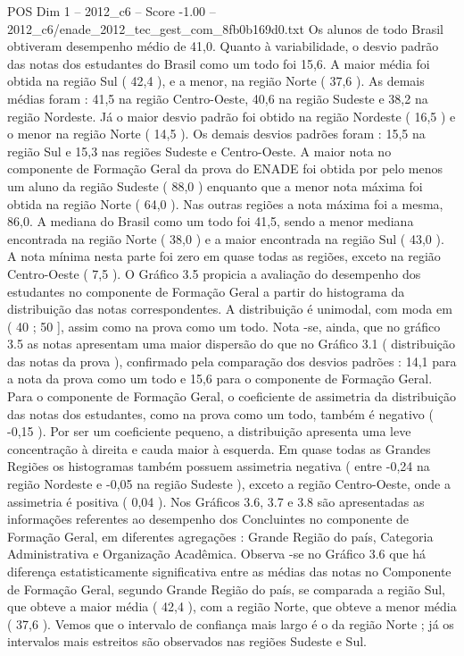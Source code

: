 \begin{textsample}{POS Dim 1 – 2012\_c6 – Score -1.00 – 2012\_c6/enade\_2012\_tec\_gest\_com\_8fb0b169d0.txt}
Os alunos de todo Brasil obtiveram desempenho médio de 41,0.
Quanto à variabilidade, o desvio padrão das notas dos estudantes do Brasil como um todo foi 15,6.
A maior média foi obtida na região Sul ( 42,4 ), e a menor, na região Norte ( 37,6 ).
As demais médias foram : 41,5 na região Centro-Oeste, 40,6 na região Sudeste e 38,2 na região Nordeste.
Já o maior desvio padrão foi obtido na região Nordeste ( 16,5 ) e o menor na região Norte ( 14,5 ).
Os demais desvios padrões foram : 15,5 na região Sul e 15,3 nas regiões Sudeste e Centro-Oeste.
A maior nota no componente de Formação Geral da prova do ENADE foi obtida por pelo menos um aluno da região Sudeste ( 88,0 ) enquanto que a menor nota máxima foi obtida na região Norte ( 64,0 ).
Nas outras regiões a nota máxima foi a mesma, 86,0.
A mediana do Brasil como um todo foi 41,5, sendo a menor mediana encontrada na região Norte ( 38,0 ) e a maior encontrada na região Sul ( 43,0 ).
A nota mínima nesta parte foi zero em quase todas as regiões, exceto na região Centro-Oeste ( 7,5 ).
O Gráfico 3.5 propicia a avaliação do desempenho dos estudantes no componente de Formação Geral a partir do histograma da distribuição das notas correspondentes.
A distribuição é unimodal, com moda em ( 40 ; 50 ], assim como na prova como um todo.
Nota -se, ainda, que no gráfico 3.5 as notas apresentam uma maior dispersão do que no Gráfico 3.1 ( distribuição das notas da prova ), confirmado pela comparação dos desvios padrões : 14,1 para a nota da prova como um todo e 15,6 para o componente de Formação Geral.
Para o componente de Formação Geral, o coeficiente de assimetria da distribuição das notas dos estudantes, como na prova como um todo, também é negativo ( -0,15 ).
Por ser um coeficiente pequeno, a distribuição apresenta uma leve concentração à direita e cauda maior à esquerda.
Em quase todas as Grandes Regiões os histogramas também possuem assimetria negativa ( entre -0,24 na região Nordeste e -0,05 na região Sudeste ), exceto a região Centro-Oeste, onde a assimetria é positiva ( 0,04 ).
Nos Gráficos 3.6, 3.7 e 3.8 são apresentadas as informações referentes ao desempenho dos Concluintes no componente de Formação Geral, em diferentes agregações : Grande Região do país, Categoria Administrativa e Organização Acadêmica.
Observa -se no Gráfico 3.6 que há diferença estatisticamente significativa entre as médias das notas no Componente de Formação Geral, segundo Grande Região do país, se comparada a região Sul, que obteve a maior média ( 42,4 ), com a região Norte, que obteve a menor média ( 37,6 ).
Vemos que o intervalo de confiança mais largo é o da região Norte ; já os intervalos mais estreitos são observados nas regiões Sudeste e Sul.

\end{textsample}
